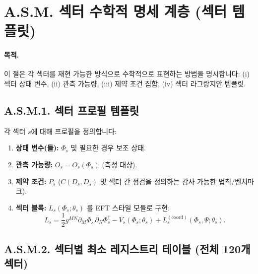 \documentclass[13pt,a4paper]{article}
\begin{document}
	\section*{A.S.M. 섹터 수학적 명세 계층 (섹터 템플릿)}
	\label{sec:sector-math-layer}
	
	\paragraph{목적.}
	이 절은 각 섹터를 재현 가능한 방식으로 수학적으로 표현하는 방법을 명시합니다: (i) 섹터 상태 변수, (ii) 관측 가능량, (iii) 제약 조건 집합, (iv) 섹터 라그랑지안 템플릿.
	
	\subsection*{A.S.M.1. 섹터 프로필 템플릿}
	
	각 섹터 $s$에 대해 프로필을 정의합니다:
	\begin{enumerate}[leftmargin=*]
		\item \textbf{상태 변수(들):} $\Phi_s$ 및 필요한 경우 보조 상태.
		\item \textbf{관측 가능량:} $O_s=O_s(\Phi_s)$ (측정 대상).
		\item \textbf{제약 조건:} $P_s$ ($C(D_s,D_s)$ 및 섹터 간 점검을 정의하는 감사 가능한 법칙/벤치마크).
		\item \textbf{섹터 블록:} $L_s(\Phi_s;\theta_s)$ 를 EFT 스타일 모듈로 구현:
		$$
		L_s = \frac{1}{2}g^{MN}\partial_M\Phi_s\,\partial_N\Phi_s^\dagger - V_s(\Phi_s;\theta_s) + L^{(\mathrm{coord})}_s(\Phi_s,\Psi;\theta_s).
		$$
	\end{enumerate}
	
	\subsection*{A.S.M.2. 섹터별 최소 레지스트리 테이블 (전체 120개 섹터)}
	
\end{document}
